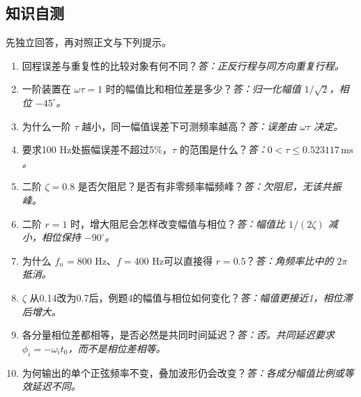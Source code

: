 \subsection*{知识自测}
先独立回答，再对照正文与下列提示。
\begin{enumerate}
\item 回程误差与重复性的比较对象有何不同？\textit{答：正反行程与同方向重复行程。}
\item 一阶装置在 $\omega\tau=1$ 时的幅值比和相位差是多少？\textit{答：归一化幅值 $1/\sqrt2$，相位 $-45^\circ$。}
\item 为什么一阶 $\tau$ 越小，同一幅值误差下可测频率越高？\textit{答：误差由 $\omega\tau$ 决定。}
\item 要求100 Hz处振幅误差不超过5\%，$\tau$ 的范围是什么？\textit{答：$0<\tau\leq0.523117\,\mathrm{ms}$。}
\item 二阶 $\zeta=0.8$ 是否欠阻尼？是否有非零频率幅频峰？\textit{答：欠阻尼，无该共振峰。}
\item 二阶 $r=1$ 时，增大阻尼会怎样改变幅值与相位？\textit{答：幅值比 $1/(2\zeta)$ 减小，相位保持 $-90^\circ$。}
\item 为什么 $f_n=800$ Hz、$f=400$ Hz可以直接得 $r=0.5$？\textit{答：角频率比中的 $2\pi$ 抵消。}
\item $\zeta$ 从0.14改为0.7后，例题4的幅值与相位如何变化？\textit{答：幅值更接近1，相位滞后增大。}
\item 各分量相位差都相等，是否必然是共同时间延迟？\textit{答：否。共同延迟要求 $\phi_i=-\omega_it_0$，而不是相位差相等。}
\item 为何输出的单个正弦频率不变，叠加波形仍会改变？\textit{答：各成分幅值比例或等效延迟不同。}
\end{enumerate}

